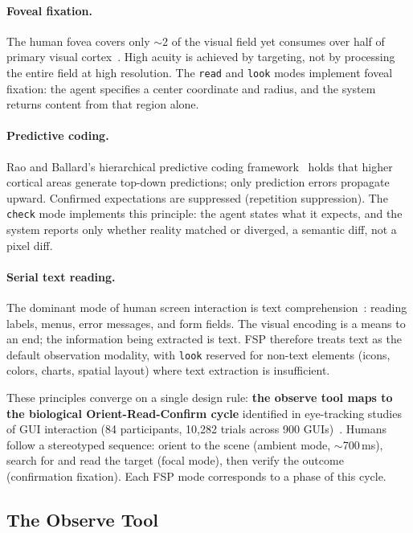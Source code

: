 \documentclass[11pt,a4paper]{article}
\begin{document}
\paragraph{Foveal fixation.}
The human fovea covers only $\sim$2\textdegree{} of the visual field yet
consumes over half of primary visual cortex~\cite{wandell2007visual}. High
acuity is achieved by targeting, not by processing the entire field at
high resolution. The \texttt{read} and \texttt{look} modes implement foveal
fixation: the agent specifies a center coordinate and radius, and the system
returns content from that region alone.

\paragraph{Predictive coding.}
Rao and Ballard's hierarchical predictive coding
framework~\cite{rao-ballard-1999} holds that higher cortical areas generate
top-down predictions; only prediction errors propagate upward.
Confirmed expectations are suppressed (repetition suppression). The
\texttt{check} mode implements this principle: the agent states what it expects,
and the system reports only whether reality matched or diverged, a semantic
diff, not a pixel diff.

\paragraph{Serial text reading.}
The dominant mode of human screen interaction is text
comprehension~\cite{rayner-eye-movements}: reading labels, menus, error messages, and
form fields. The visual encoding is a means to an end; the information
being extracted is text. FSP therefore treats text as the default
observation modality, with \texttt{look} reserved for non-text elements
(icons, colors, charts, spatial layout) where text extraction is
insufficient.

\medskip
\noindent
These principles converge on a single design rule: \textbf{the observe tool
maps to the biological Orient-Read-Confirm cycle} identified in eye-tracking
studies of GUI interaction (84 participants, 10{,}282 trials across 900
GUIs)~\cite{gui-eye-tracking}. Humans follow a
stereotyped sequence: orient to the scene (ambient mode, $\sim$700\,ms),
search for and read the target (focal mode), then verify the outcome
(confirmation fixation). Each FSP mode corresponds to a phase of this cycle.

\subsection{The Observe Tool}
\label{sec:observe-tool}
\end{document}
